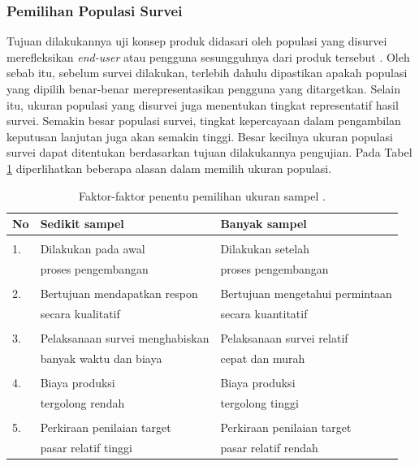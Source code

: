 \subsubsection{Pemilihan Populasi Survei}
Tujuan dilakukannya uji konsep produk didasari oleh populasi yang disurvei merefleksikan \textit{end-user} atau pengguna sesungguhnya dari produk tersebut \cite{bukuUlrich}. Oleh sebab itu, sebelum survei dilakukan, terlebih dahulu dipastikan apakah populasi yang dipilih benar-benar merepresentasikan pengguna yang ditargetkan. Selain itu, ukuran populasi yang disurvei juga menentukan tingkat representatif hasil survei. Semakin besar populasi survei, tingkat kepercayaan dalam pengambilan keputusan lanjutan juga akan semakin tinggi. Besar kecilnya ukuran populasi survei dapat ditentukan berdasarkan tujuan dilakukannya pengujian. Pada Tabel \ref{tab:ukuran-sampel} diperlihatkan beberapa alasan dalam memilih ukuran populasi. \par 
\begin{table}[h!]
    \centering
    \caption{Faktor-faktor penentu pemilihan ukuran sampel \cite{bukuUlrich}.}
    \begin{tabular}{m{0.7cm} m{6cm} m{6cm}}
        \hline
        \textbf{No} & \textbf{Sedikit sampel} & \textbf{Banyak sampel}\\
        \hline
        &&\\
        1. & Dilakukan pada awal & Dilakukan setelah\\
        & proses pengembangan & proses pengembangan\\
        &&\\
        2. & Bertujuan mendapatkan respon & Bertujuan mengetahui permintaan\\
        & secara kualitatif & secara kuantitatif\\
        &&\\
        3. & Pelaksanaan survei menghabiskan & Pelaksanaan survei relatif\\
        & banyak waktu dan biaya & cepat dan murah\\
        &&\\
        4. & Biaya produksi & Biaya produksi\\
        & tergolong rendah & tergolong tinggi\\
        &&\\
        5. & Perkiraan penilaian target & Perkiraan penilaian target\\
        & pasar relatif tinggi & pasar relatif rendah\\
        \hline
    \end{tabular}
    \label{tab:ukuran-sampel}
\end{table}
